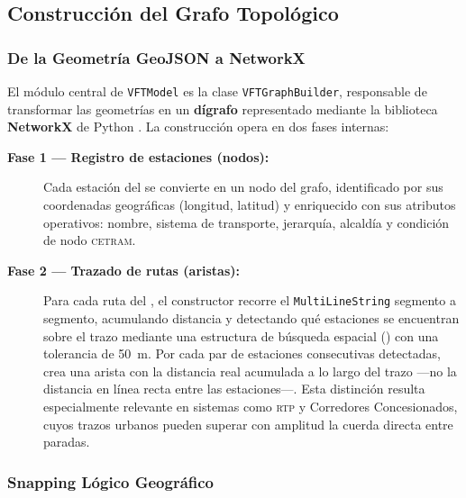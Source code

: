 
\subsection{Construcción del Grafo Topológico}
\label{sec:vft-grafo}

\subsubsection{De la Geometría GeoJSON a NetworkX}
\label{subsec:vft-geom-networkx}

El módulo central de \texttt{VFTModel} es la clase \texttt{VFTGraphBuilder}, responsable
de transformar las geometrías \geojson{} en un \textbf{dígrafo} representado
mediante la biblioteca \textbf{NetworkX} de Python \citep{hagberg2008networkx}.
La construcción opera en dos fases internas:

\begin{description}
    \item[\textbf{Fase 1 — Registro de estaciones (nodos):}]
    Cada estación del \geojson{} se convierte en un nodo del grafo,
    identificado por sus coordenadas geográficas (longitud, latitud) y
    enriquecido con sus atributos operativos: nombre, sistema de transporte,
    jerarquía, alcaldía y condición de nodo \textsc{cetram}.

    \item[\textbf{Fase 2 — Trazado de rutas (aristas):}]
    Para cada ruta del \geojson{}, el constructor recorre el
    \texttt{MultiLineString} segmento a segmento, acumulando distancia y
    detectando qué estaciones se encuentran sobre el trazo mediante una
    estructura de búsqueda espacial () con una tolerancia de
    50~m. Por cada par de estaciones consecutivas detectadas, crea una arista
    con la distancia real acumulada a lo largo del trazo —no la distancia en
    línea recta entre las estaciones—. Esta distinción resulta especialmente
    relevante en sistemas como \textsc{rtp} y Corredores Concesionados, cuyos
    trazos urbanos pueden superar con amplitud la cuerda directa entre paradas.
\end{description}

\subsubsection{Snapping Lógico Geográfico}
\label{subsec:vft-snapping}

